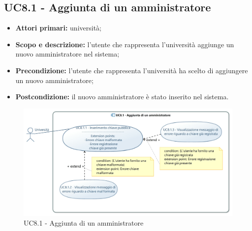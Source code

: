 \documentclass[AnalisiDeiRequisiti.tex]{subfiles}
\begin{document}
\subsection{UC8.1 - Aggiunta di un amministratore}
\begin{itemize}
	\item \textbf{Attori primari:} università;\\
	\item \textbf{Scopo e descrizione:} l'utente che rappresenta l'università aggiunge un nuovo amministratore nel sistema;
	\item \textbf{Precondizione:} l'utente che rappresenta l'università ha scelto di aggiungere un nuovo amministratore; 
	\item \textbf{Postcondizione:} il nuovo amministratore è stato inserito nel sistema.
\end{itemize}

\begin{figure}[H]
	\centering
	\includegraphics[width=1.0\linewidth]{UC8_1.jpg}
	\caption{UC8.1 - Aggiunta di un amministratore}
	\label{fig:UC8.1 - Aggiunta di un amministratore}
\end{figure}
\end{document}
